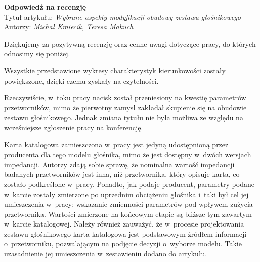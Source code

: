 \documentclass[12pt]{article}
\begin{document}
    
    \begin{center}
        \textbf{Odpowiedź na recenzję }\\
        \vspace{10pt}
        Tytuł artykułu: \textit{Wybrane aspekty modyfikacji obudowy zestawu głośnikowego} \\
        Autorzy: \textit{Michał Kmiecik, Teresa Makuch}
    \end{center}

    Dziękujemy za pozytywną recenzję oraz cenne uwagi dotyczące pracy, do których odnosimy się poniżej.
    
    Wszystkie przedstawione wykresy charakterystyk kierunkowości zostały powiększone, dzięki czemu zyskały na czytelności.
    
    Rzeczywiście, w~toku pracy nacisk został przeniesiony na kwestię parametrów przetworników, mimo że pierwotny zamysł zakładał skupienie się na obudowie zestawu głośnikowego. Jednak zmiana tytułu nie była możliwa ze względu na wcześniejsze zgłoszenie pracy na konferencję.
    
    Karta katalogowa zamieszczona w~pracy jest jedyną udostępnioną przez producenta dla tego modelu głośnika, mimo że jest dostępny w~dwóch wersjach impedancji. Autorzy zdają sobie sprawę, że nominalna wartość impedancji badanych przetworników jest inna, niż przetwornika, który opisuje karta, co zostało podkreślone w~pracy. Ponadto, jak podaje producent, parametry podane w~karcie zostały zmierzone po uprzednim obciążeniu głośnika i~taki był cel jej umieszczenia w~pracy: wskazanie zmienności parametrów pod wpływem zużycia przetwornika. Wartości zmierzone na końcowym etapie są bliższe tym zawartym w~karcie katalogowej. Należy również zauważyć, że w~procesie projektowania zestawu głośnikowego karta katalogowa jest podstawowym źródłem informacji o~przetworniku, pozwalającym na podjęcie decyzji o~wyborze modelu. Takie uzasadnienie jej umieszczenia w~zestawieniu dodano do artykułu.
    
\end{document}
